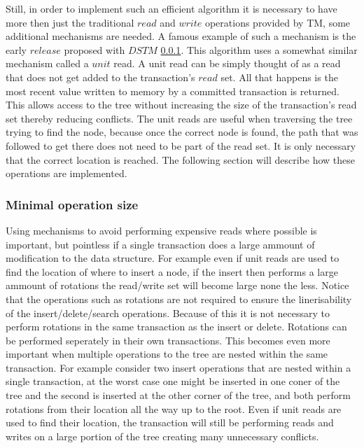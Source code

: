 \documentclass[10pt]{sigplanconf}
\begin{document}
Still, in order to implement such an efficient algorithm it is necessary to have more then just the traditional $read$ and $write$ operations provided by TM, some additional mechanisms are needed.
A famous example of such a mechanism is the early $release$ proposed with $DSTM$ \ref{}.
This algorithm uses a somewhat similar mechanism called a $unit$ read.
A unit read can be simply thought of as a read that does not get added to the transaction's $read$ set.
All that happens is the most recent value written to memory by a  committed transaction is returned.
This allows access to the tree without increasing the size of the transaction's read set thereby reducing conflicts.
The unit reads are useful when traversing the tree trying to find the node, because once the correct node is found, the path that was followed to get there does not need to be part of the read set.
It is only necessary that the correct location is reached.
The following section will describe how these operations are implemented.

\subsubsection{Minimal operation size}
Using mechanisms to avoid performing expensive reads where possible is important, but pointless if a single transaction does a large ammount of modification to the data structure.
For example even if unit reads are used to find the location of where to insert a node, if the insert then performs a large ammount of rotations
the read/write set will become large none the less.
Notice that the operations such as rotations are not required to ensure the linerisability of the insert/delete/search operations.
Because of this it is not necessary to perform rotations in the same transaction as the insert or delete.
Rotations can be performed seperately in their own transactions.
This becomes even more important when multiple operations to the tree are nested within the same transaction.
For example consider two insert operations that are nested within a single transaction, at the worst case one might be inserted in one coner of the tree
and the second is inserted at the other corner of the tree, and both perform rotations from their location all the way up to the root.
Even if unit reads are used to find their location, the transaction will still be performing reads and writes on a large portion of the tree creating many unnecessary conflicts.
\end{document}
